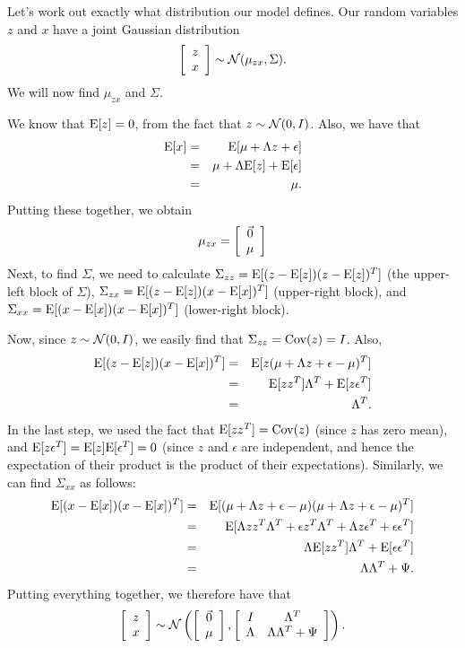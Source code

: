 \documentclass{article}
\begin{document}
Let's work out exactly what distribution our model defines.  Our random
variables $z$ and $x$ have a joint Gaussian distribution
\[
\left[\begin{array}{c} z \\ x \end{array} \right] \sim {\cal N}(\mu_{zx}, \Sigma).
\]
We will now find $\mu_{zx}$ and $\Sigma$.

We know that ${\rm E}[z] = 0$, from the fact that $z \sim {\cal N}(0,I)$.  Also, we have
that
\begin{eqnarray*}
{\rm E}[x] &=& {\rm E}[\mu+\Lambda z +\epsilon] \\
  &=& \mu + \Lambda {\rm E}[z] + {\rm E}[\epsilon] \\
  &=& \mu.
\end{eqnarray*}
Putting these together, we obtain
\[
\mu_{zx} = \left[\begin{array}{c} \vec{0} \\ \mu \end{array} \right]
\]
Next, to find $\Sigma$, we need to calculate
$\Sigma_{zz} = {\rm E}[(z-{\rm E}[z])(z-{\rm E}[z])^T]$ (the upper-left block of $\Sigma$),
$\Sigma_{zx} = {\rm E}[(z-{\rm E}[z])(x-{\rm E}[x])^T]$ (upper-right block),
and $\Sigma_{xx} = {\rm E}[(x-{\rm E}[x])(x-{\rm E}[x])^T]$ (lower-right block).

Now, since $z \sim {\cal N}(0,I)$, we easily find that $\Sigma_{zz} = {\rm Cov}(z) = I$.
Also,
\begin{eqnarray*}
{\rm E}[(z-{\rm E}[z])(x-{\rm E}[x])^T] &=& {\rm E}[z(\mu+\Lambda z + \epsilon - \mu)^T] \\
  &=& {\rm E}[zz^T]\Lambda^T + {\rm E}[z\epsilon^T] \\
  &=& \Lambda^T.
\end{eqnarray*}
In the last step, we used the fact that ${\rm E}[zz^T] = {\rm Cov}(z)$ (since $z$ has zero mean),
and ${\rm E}[z\epsilon^T] = {\rm E}[z]{\rm E}[\epsilon^T] = 0$ (since $z$ and $\epsilon$ are independent,
and hence the expectation of their product is the product of their expectations).
Similarly, we can find $\Sigma_{xx}$ as follows:
\begin{eqnarray*}
{\rm E}[(x-{\rm E}[x])(x-{\rm E}[x])^T] &=& {\rm E}[(\mu+\Lambda z + \epsilon - \mu) (\mu+\Lambda z + \epsilon - \mu)^T] \\
&=& {\rm E}[\Lambda zz^T \Lambda^T + \epsilon z^T\Lambda^T + \Lambda z \epsilon^T + \epsilon\epsilon^T] \\
&=& \Lambda {\rm E}[zz^T] \Lambda^T + {\rm E}[\epsilon\epsilon^T] \\
&=& \Lambda \Lambda^T + \Psi.
\end{eqnarray*}
Putting everything together, we therefore have that
\begin{equation}
\left[\begin{array}{c} z \\ x \end{array} \right] \sim {\cal N}\left(\left[\begin{array}{c} \vec{0} \\ \mu \end{array} \right], \left[\begin{array}{cc} I & \Lambda^T \\ \Lambda & \Lambda\Lambda^T+\Psi \end{array} \right]\right). \label{eqn-jointzx}
\end{equation}
\end{document}
